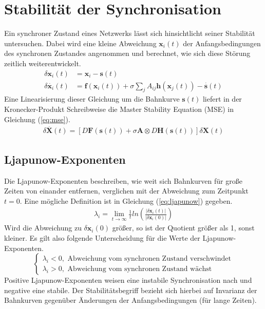 \section{Stabilität der Synchronisation}
Ein synchroner Zustand eines Netzwerks lässt sich hinsichtlicht seiner Stabilität untersuchen. Dabei wird eine kleine Abweichung $\boldsymbol{x}_i(t)$ der Anfangsbedingungen des synchronen Zustandes angenommen und berechnet, wie sich diese Störung zeitlich weiterentwickelt.
\begin{align}\label{eq:deltaxi}
\delta \boldsymbol{x}_i(t) &= \boldsymbol{x}_i - \boldsymbol{s}(t)\\
\delta \overset{\cdot}{\boldsymbol{x}}_i(t) &= \boldsymbol{f}(\boldsymbol{x}_i(t))+\sigma\sum_j A_{ij}\boldsymbol{h}\left(\boldsymbol{x}_j(t)\right) - \overset{\cdot}{\boldsymbol{s}}(t)
\end{align}
Eine Linearisierung dieser Gleichung um die Bahnkurve $\boldsymbol{s}(t)$ liefert in der Kronecker-Produkt Schreibweise die Master Stability Equation (MSE) in Gleichung (\ref*{eq:mse}).
\begin{align}\label{eq:mse}
\delta\overset{\cdot}{\boldsymbol{X}}(t)=
\left[D\boldsymbol{F}(\boldsymbol{s}(t))+\sigma\boldsymbol{A}\otimes D\boldsymbol{H}(\boldsymbol{s}(t))\right]\delta\boldsymbol{X}(t)
\end{align}

\subsection*{Ljapunow-Exponenten}
Die Ljapunow-Exponenten beschreiben, wie weit sich Bahnkurven für große Zeiten von einander entfernen, verglichen mit der Abweichung zum Zeitpunkt $t=0$. Eine mögliche Definition ist in Gleichung (\ref{eq:ljapunow}) gegeben.
\begin{align}\label{eq:ljapunow}
\lambda_i=\lim_{t\rightarrow\infty}\frac{1}{t} ln\left(\frac{|\delta \boldsymbol{x}_i(t)|}{|\delta \boldsymbol{x}_i(0)|}\right)
\end{align}
Wird die Abweichung zu $\delta\boldsymbol{x}_i(0)$ größer, so ist der Quotient größer als 1, sonst kleiner. Es gilt also folgende Unterscheidung für die Werte der Ljapunow-Exponenten.
\begin{equation}
\begin{cases}
\lambda_i < 0, \text{ Abweichung vom synchronen Zustand verschwindet}\\
\lambda_i > 0, \text{ Abweichung vom synchronen Zustand wächst}
\end{cases}
\end{equation}
Positive Ljapunow-Exponenten weisen eine instabile Synchronisation nach und negative eine stabile. Der Stabilitätsbegriff bezieht sich hierbei auf Invarianz der Bahnkurven gegenüber Änderungen der Anfangsbedingungen (für lange Zeiten). 
